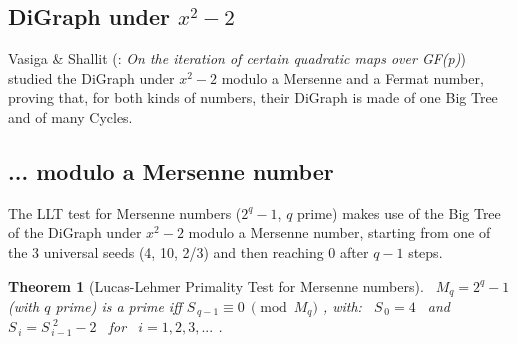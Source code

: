 \documentclass[latin1]{quadrature}
\newcommand{\PMod}[1]{\!\!\pmod{#1}}
\newtheorem{theorem}{Theorem}
\newif\ifenfrancais
\begin{document}
\begin{article}
\begin{article}
\section{ DiGraph under $x^2-2$ }
\fi

\ifenfrancais
Vasiga \& Shallit (\cite{Shallit-Vasiga}: \emph{On the iteration of certain quadratic maps over GF(p)}) ont \'etudi\'e le DiGraph sous $x^2-2$ modulo un nombre de Mersenne ou un nombre de Fermat et ont montr\'e que,  pour chacun de ces types de nombres, leur DiGraph est constitu\'e d'un unique Arbre G\'eant et de nombreux Cycles.
\else
Vasiga \& Shallit (\cite{Shallit-Vasiga}: \emph{On the iteration of certain quadratic maps over GF(p)}) studied the DiGraph under $x^2-2$ modulo a Mersenne and a Fermat number, proving that, for both kinds of numbers, their DiGraph is made of one Big Tree and of many Cycles.
\fi

\ifenfrancais
\subsection{ ...  modulo un nombre de Mersenne }
\else
\subsection{ ...  modulo a Mersenne number }
\fi

\ifenfrancais
Le test de primalit\'e LLT pour les nombres de Mersenne ($2^q-1$, $q$ premier) parcourt l'Arbre G\'eant du DiGraph sous $x^2-2$ modulo un nombre de Mersenne, en utilisant comme graine (seed) l'une des 3 graines universelles (4, 10, 2/3) et aboutissant \`a $0$ apr\`es $q-1$ it\'erations.
\else
The LLT test for Mersenne numbers ($2^q-1$, $q$ prime) makes use of the Big Tree of the DiGraph under $x^2-2$ modulo a Mersenne number, starting from one of the 3 universal seeds (4, 10, 2/3) and then reaching $0$ after $q-1$ steps.
\fi

\vspace{-.1in}

\ifenfrancais
\begin{theorem}[Test de Primalit\'e de Lucas-Lehmer pour les nombres de Mersenne]
\ 
$M_q = 2^q-1$ (avec $q$ prime) est premier ssi $S_{\,q-1} \equiv 0 \ \PMod{M_q}$ ,
avec : \ $S_{\,0} = 4$ \ et \ $S_{\,i} = S_{\,i-1}^{\,\,2} - 2$ \ pour \ $i=1,2,3, ...$ .
\end{theorem}
\else
\begin{theorem}[Lucas-Lehmer Primality Test for Mersenne numbers]
\ 
$M_q = 2^q-1$ (with $q$ prime) is a prime iff $S_{\,q-1} \equiv 0 \ \PMod{M_q}$ ,
with: \ $S_{\,0} = 4$ \ and \ $S_{\,i} = S_{\,i-1}^{\,\,2} - 2$ \ for \ $i=1,2,3, ...$ .
\end{theorem}
\fi


\end{article}
\end{article}
\end{document}
